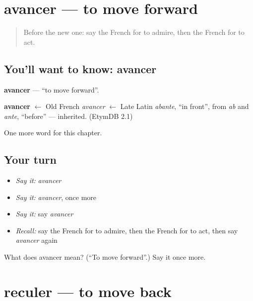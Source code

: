 \section[avancer]{avancer — to move forward}

\label{lesson:FR-C152-avancer}



\begin{quote}
Before the new one: say the French for to admire, then the French for to act.
\end{quote}

\subsection*{You'll want to know: avancer}
\textbf{avancer} — \textquotedblleft{}to move forward\textquotedblright{}.

\begin{cousinweb}
\textbf{avancer} $\leftarrow$ Old French \emph{avancer} $\leftarrow$ Late Latin \emph{abante}, \textquotedblleft{}in front\textquotedblright{}, from \emph{ab} and \emph{ante}, \textquotedblleft{}before\textquotedblright{} — inherited. (EtymDB 2.1)
\end{cousinweb}

\begin{grammarlens}[title={What you've built}]
One more word for this chapter.
\end{grammarlens}

\subsection*{Your turn}
\begin{itemize}
\raggedright
  \item \emph{Say it:} \emph{avancer}
  \item \emph{Say it:} \emph{avancer}, once more
  \item \emph{Say it:} say \emph{avancer}
  \item \emph{Recall:} say the French for to admire, then the French for to act, then say \emph{avancer} again
\end{itemize}

\begin{tcolorbox}[breakable,colback=teal!4,colframe=teal!35!black,title={Before you move on}]
What does avancer mean? (\textquotedblleft{}To move forward\textquotedblright{}.) Say it once more.
\end{tcolorbox}
\section[reculer]{reculer — to move back}


